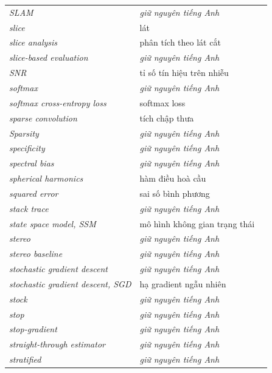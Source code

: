 \documentclass[deep_learning.tex]{subfiles}
\begin{document}
\begin{longtable}{@{}L{5.2cm}L{5.9cm}L{2.6cm}@{}}
\emph{SLAM} & \emph{\color{tiercol}giữ nguyên tiếng Anh} & \\
\emph{slice} & lát & \\
\emph{slice analysis} & phân tích theo lát cắt & \\
\emph{slice-based evaluation} & \emph{\color{tiercol}giữ nguyên tiếng Anh} & \\
\emph{SNR} & tỉ số tín hiệu trên nhiễu & \\
\emph{softmax} & \emph{\color{tiercol}giữ nguyên tiếng Anh} & \\
\emph{softmax cross-entropy loss} & softmax loss & \\
\emph{sparse convolution} & tích chập thưa & \\
\emph{Sparsity} & \emph{\color{tiercol}giữ nguyên tiếng Anh} & \\
\emph{specificity} & \emph{\color{tiercol}giữ nguyên tiếng Anh} & \\
\emph{spectral bias} & \emph{\color{tiercol}giữ nguyên tiếng Anh} & \\
\emph{spherical harmonics} & hàm điều hoà cầu & \\
\emph{squared error} & sai số bình phương & \\
\emph{stack trace} & \emph{\color{tiercol}giữ nguyên tiếng Anh} & \\
\emph{state space model, SSM} & mô hình không gian trạng thái & \\
\emph{stereo} & \emph{\color{tiercol}giữ nguyên tiếng Anh} & \\
\emph{stereo baseline} & \emph{\color{tiercol}giữ nguyên tiếng Anh} & \\
\emph{stochastic gradient descent} & \emph{\color{tiercol}giữ nguyên tiếng Anh} & \\
\emph{stochastic gradient descent, SGD} & hạ gradient ngẫu nhiên & \\
\emph{stock} & \emph{\color{tiercol}giữ nguyên tiếng Anh} & \\
\emph{stop} & \emph{\color{tiercol}giữ nguyên tiếng Anh} & \\
\emph{stop-gradient} & \emph{\color{tiercol}giữ nguyên tiếng Anh} & \\
\emph{straight-through estimator} & \emph{\color{tiercol}giữ nguyên tiếng Anh} & \\
\emph{stratified} & \emph{\color{tiercol}giữ nguyên tiếng Anh} & \\

\end{longtable}
\end{document}
